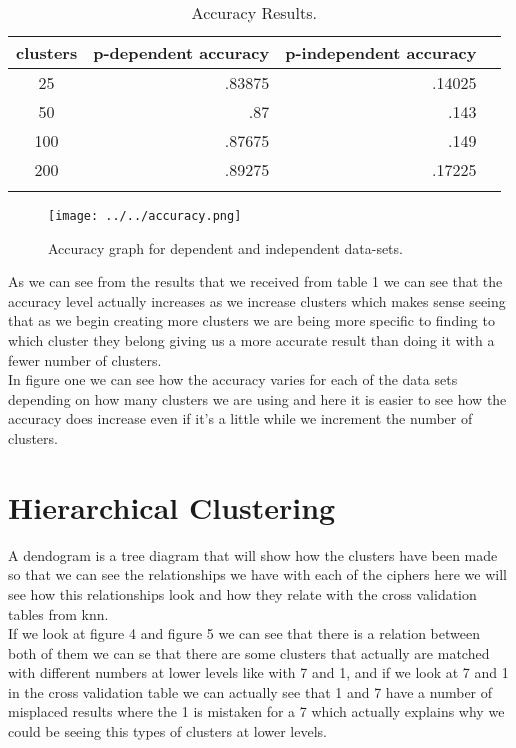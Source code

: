 \documentclass[paper=a4, fontsize=11pt]{scrartcl} %
\begin{document}
\begin{table}[h]
\centering
\caption{Accuracy Results.}
\label{tab:pca}
\begin{tabular}{|c|r|r|r|}
\hline
clusters & p-dependent accuracy & p-independent accuracy  \\ \hline
25    & .83875              & .14025                   \\
50    & .87              & .143                       \\
100   & .87675             & .149                        \\
200    & .89275             & .17225                 \\
\\ \hline
\end{tabular}
\end{table}

\begin{figure}[h]
	\centering
	\texttt{[image: ../../accuracy.png]}
	\caption{Accuracy graph for dependent and independent data-sets.}
	\label{fig:scree}
\end{figure}


As we can see from the results that we received from table 1 we can see that the accuracy level actually increases as we increase clusters which makes sense seeing that as we begin creating more clusters we are being more specific to finding to which cluster they belong giving us a more accurate result than doing it with a fewer number of clusters.\\

In figure one we can see how the accuracy varies for each of the data sets depending on how many clusters we are using and here it is easier to see how the accuracy does increase even if it's a little while we increment the number of clusters.


\clearpage
\section{Hierarchical Clustering}
A dendogram is a tree diagram that will show how the clusters have been made so that we can see the relationships we have with each of the ciphers here we will see how this relationships look and how they relate with the cross validation tables from knn.\\

If we look at figure 4 and figure 5 we can see that there is a relation between both of them we can se that there are some clusters that actually are matched with different numbers at lower levels like with 7 and 1, and if we look at 7 and 1 in the cross validation table we can actually see that 1 and 7 have a number of misplaced results where the 1 is mistaken for a 7 which actually explains why we could be seeing this types of clusters at lower levels.
\end{document}
